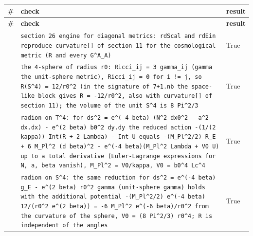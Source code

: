 \documentclass[10pt,a4paper]{article}
\begin{document}
{\footnotesize
\begin{longtable}{>{\raggedright\arraybackslash}p{}>{\raggedright\arraybackslash}p{}>{\raggedright\arraybackslash}p{}}
\toprule
\textbf{\#} & \textbf{check} & \textbf{result} \\
\midrule\endfirsthead
\toprule
\textbf{\#} & \textbf{check} & \textbf{result} \\
\midrule\endhead
\endfoot
\bottomrule\endlastfoot
447 & \texttt{section 26 engine for diagonal metrics: rdScal and rdEin reproduce curvature[] of section 11 for the cosmological metric (R and every G\textasciicircum{}A\_\allowbreak{}A)} & True \\
448 & \texttt{the 4-sphere of radius r0: Ricci\_\allowbreak{}ij = 3 gamma\_\allowbreak{}ij (gamma the unit-sphere metric), Ricci\_\allowbreak{}ij = 0 for i != j, so R(S\textasciicircum{}4) = 12/\allowbreak{}r0\textasciicircum{}2 (in the signature of 7+1.nb the space-like block gives R = -12/\allowbreak{}r0\textasciicircum{}2, also with curvature[] of section 11); the volume of the unit S\textasciicircum{}4 is 8 Pi\textasciicircum{}2/\allowbreak{}3} & True \\
449 & \texttt{radion on T\textasciicircum{}4: for ds\textasciicircum{}2 = e\textasciicircum{}(-4 beta) (N\textasciicircum{}2 dx0\textasciicircum{}2 - a\textasciicircum{}2 dx.dx) - e\textasciicircum{}(2 beta) b0\textasciicircum{}2 dy.dy the reduced action -(1/\allowbreak{}(2 kappa)) Int(R + 2 Lambda) - Int U equals -(M\_\allowbreak{}Pl\textasciicircum{}2/\allowbreak{}2) R\_\allowbreak{}E + 6 M\_\allowbreak{}Pl\textasciicircum{}2 (d beta)\textasciicircum{}2 - e\textasciicircum{}(-4 beta)(M\_\allowbreak{}Pl\textasciicircum{}2 Lambda + V0 U) up to a total derivative (Euler-Lagrange expressions for N, a, beta vanish), M\_\allowbreak{}Pl\textasciicircum{}2 = V0/\allowbreak{}kappa, V0 = b0\textasciicircum{}4 Lc\textasciicircum{}4} & True \\
450 & \texttt{radion on S\textasciicircum{}4: the same reduction for ds\textasciicircum{}2 = e\textasciicircum{}(-4 beta) g\_\allowbreak{}E - e\textasciicircum{}(2 beta) r0\textasciicircum{}2 gamma (unit-sphere gamma) holds with the additional potential -(M\_\allowbreak{}Pl\textasciicircum{}2/\allowbreak{}2) e\textasciicircum{}(-4 beta) 12/\allowbreak{}(r0\textasciicircum{}2 e\textasciicircum{}(2 beta)) = -6 M\_\allowbreak{}Pl\textasciicircum{}2 e\textasciicircum{}(-6 beta)/\allowbreak{}r0\textasciicircum{}2 from the curvature of the sphere, V0 = (8 Pi\textasciicircum{}2/\allowbreak{}3) r0\textasciicircum{}4; R is independent of the angles} & True \\

\end{longtable}}
\end{document}
